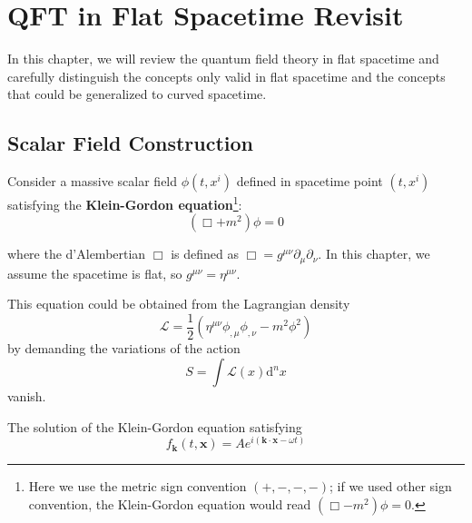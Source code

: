 \documentclass[12pt]{article}
\numberwithin{equation}{section}
\theoremstyle{1style}
\newcommand{\p}{\partial}
\begin{document}
\newpage





























\section{QFT in Flat Spacetime Revisit}
In this chapter, we will review the quantum field theory in flat spacetime and carefully distinguish
the concepts only valid in flat spacetime and the concepts that could be generalized to curved spacetime.
\subsection{Scalar Field Construction}

Consider a massive scalar field \(\phi(t,x^{i})\) defined in spacetime point \((t,x^{i})\) satisfying the \textbf{Klein-Gordon equation}\footnote{Here we use the metric sign convention \((+,-,-,-)\); if we used other sign convention, the Klein-Gordon equation
would read \((\Box - m^2) \phi = 0\).}:
\begin{equation}
  (\Box + m^2) \phi = 0
\end{equation}

where the d'Alembertian \(\Box\) is defined as \(\Box = g^{\mu\nu}\p_{\mu}\p_{\nu}\).
In this chapter, we assume the spacetime is flat, so \(g^{\mu\nu}=\eta^{\mu\nu}\).\par
This equation could be obtained from the Lagrangian density
\[\mathcal{L} = \frac{1}{2}(\eta^{\mu\nu} \phi_{,\mu} \phi_{,\nu}- m^2 \phi^2)\]
by demanding the variations of the action \[S = \int \mathcal{L}(x) \mathrm{d}^{n}x\] vanish.
\par
The solution of the Klein-Gordon equation satisfying
\[f_{\mathbf{k}}(t,\mathbf{x})= Ae^{i(\mathbf{k}\cdot \mathbf{x}-\omega t)}\]
\end{document}
